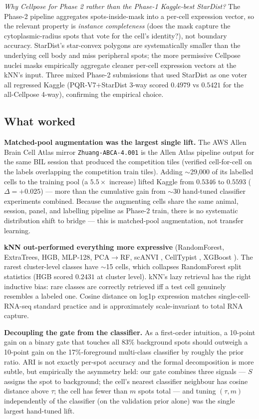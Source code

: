 \documentclass[a4paper,11pt]{article}
\begin{document}
\textit{Why Cellpose for Phase 2 rather than the Phase-1 Kaggle-best StarDist?} The Phase-2 pipeline aggregates spots-inside-mask into a per-cell expression vector, so the relevant property is \emph{instance completeness} (does the mask capture the cytoplasmic-radius spots that vote for the cell's identity?), not boundary accuracy. StarDist's star-convex polygons are systematically smaller than the underlying cell body and miss peripheral spots; the more permissive Cellpose nuclei masks empirically aggregate cleaner per-cell expression vectors at the kNN's input. Three mixed Phase-2 submissions that used StarDist as one voter all regressed Kaggle (PQR-V7$+$StarDist 3-way scored $0.4979$ vs $0.5421$ for the all-Cellpose 4-way), confirming the empirical choice.

\subsection{What worked}

\textbf{Matched-pool augmentation was the largest single lift.} The AWS Allen Brain Cell Atlas mirror \texttt{Zhuang-ABCA-4.001} is the Allen Atlas pipeline output for the same BIL session that produced the competition tiles (verified cell-for-cell on the labels overlapping the competition train tiles). Adding $\sim$29{,}000 of its labelled cells to the training pool (a $5.5\times$ increase) lifted Kaggle from $0.5346$ to $0.5593$ ($\Delta = +0.025$) --- more than the cumulative gain from $\sim$30 hand-tuned classifier experiments combined. Because the augmenting cells share the same animal, session, panel, and labelling pipeline as Phase-2 train, there is no systematic distribution shift to bridge --- this is matched-pool augmentation, not transfer learning.

\textbf{kNN out-performed everything more expressive} (RandomForest, ExtraTrees, HGB, MLP-128, PCA$\to$RF, scANVI \cite{xu2021scanvi}, CellTypist \cite{dominguez2022celltypist}, XGBoost \cite{chen2016xgboost}). The rarest cluster-level classes have $\sim$15 cells, which collapses RandomForest split statistics (HGB scored $0.2431$ at cluster level). kNN's lazy retrieval has the right inductive bias: rare classes are correctly retrieved iff a test cell genuinely resembles a labeled one. Cosine distance on log1p expression matches single-cell-RNA-seq standard practice and is approximately scale-invariant to total RNA capture.

\textbf{Decoupling the gate from the classifier.} As a first-order intuition, a 10-point gain on a binary gate that touches all 83\% background spots should outweigh a 10-point gain on the 17\%-foreground multi-class classifier by roughly the prior ratio. ARI is not exactly per-spot accuracy and the formal decomposition is more subtle, but empirically the asymmetry held: our gate combines three signals --- $S$ assigns the spot to background; the cell's nearest classifier neighbour has cosine distance above $\tau$; the cell has fewer than $m$ spots total --- and tuning $(\tau, m)$ independently of the classifier (on the validation prior alone) was the single largest hand-tuned lift.
\end{document}
